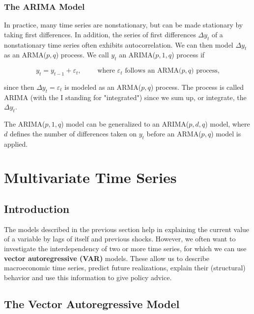 \subsubsection{The ARIMA Model}

In practice, many time series are nonstationary, but can be made stationary by taking first differences.  In addition, the series of first differences $\Delta y_t$ of a nonstationary time series often exhibits autocorrelation. We can then model $\Delta y_t$ as an ARMA($p,q$) process. We call $y_t$ an ARIMA($p,1,q$) process if 

\begin{equation}
	y_t = y_{t-1} + \varepsilon_t, \qquad \text{ where $\varepsilon_t$ follows an ARMA($p,q$) process,}
\end{equation}

since then $\Delta y_t = \varepsilon_t$ is modeled as an ARMA($p,q$) process. The process is called ARIMA (with the I standing for "integrated") since we sum up, or integrate, the $\Delta y_t$. 

The ARIMA($p,1,q$) model can be generalized to an ARIMA($p,d,q$) model, where $d$ defines the number of differences taken on $y_t$ before an ARMA($p,q$) model is applied.




\section{Multivariate Time Series}

\subsection{Introduction}

The models described in the previous section help in explaining the current value of a variable by lags of itself and previous shocks. However, we often want to investigate the interdependency of two or more time series, for which we can use \textbf{vector autoregressive (VAR)} models. These allow us to describe macroeconomic time series, predict future realizations, explain their (structural) behavior and use this information to give policy advice.

\subsection{The Vector Autoregressive Model}

